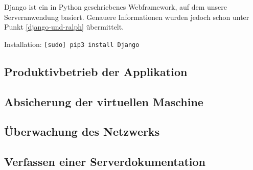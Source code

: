 Django ist ein in Python geschriebenes Webframework, auf dem unsere
Serveranwendung basiert. Genauere Informationen wurden jedoch schon
unter Punkt \ref{django-und-ralph} übermittelt.

Installation: \texttt{{[}sudo{]}\ pip3\ install\ Django}

\hypertarget{produktivbetrieb-der-applikation}{%
\subsection{Produktivbetrieb der
Applikation}\label{produktivbetrieb-der-applikation}}

\hypertarget{absicherung-der-virtuellen-maschine}{%
\subsection{Absicherung der virtuellen
Maschine}\label{absicherung-der-virtuellen-maschine}}

\hypertarget{uxfcberwachung-des-netzwerks}{%
\subsection{Überwachung des
Netzwerks}\label{uxfcberwachung-des-netzwerks}}

\hypertarget{verfassen-einer-serverdokumentation}{%
\subsection{Verfassen einer
Serverdokumentation}\label{verfassen-einer-serverdokumentation}}
